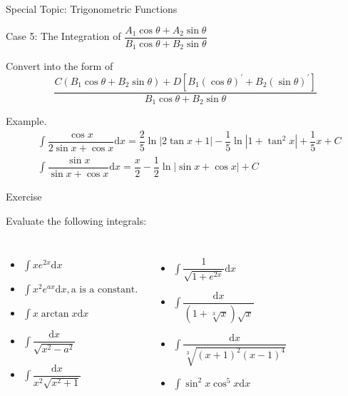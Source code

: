 \documentclass{beamer}
\begin{document}
    \begin{frame}[t]{Special Topic: Trigonometric Functions}
        \begin{block}{Case 5: The Integration of $\dfrac{A_{1} \cos \theta+A_{2} \sin \theta}{B_{1} \cos \theta+B_{2} \sin \theta}$}
        \par Convert into the form of $$\dfrac{C\left(B_{1} \cos \theta+B_{2} \sin \theta\right)+D\left[B_{1}(\cos \theta)^{\prime}+B_{2}(\sin \theta)^{\prime}\right]}{B_{1} \cos \theta+B_{2} \sin \theta}$$
        \end{block}
        \par \textcolor{yy}{Example.}
        \begin{equation*}\begin{aligned}
            & \int \dfrac{\cos x}{2 \sin x+\cos x} \mathrm{d} x = \dfrac{2}{5} \ln |2 \tan x+1|-\dfrac{1}{5} \ln \left|1+\tan ^{2} x\right|+\dfrac{1}{5} x+C\\
            & \int \dfrac{\sin x}{\sin x+\cos x} \mathrm{d} x = \dfrac{x}{2}-\dfrac{1}{2} \ln |\sin x+\cos x|+C
        \end{aligned}\end{equation*}
    \end{frame}

    \begin{frame}[t]{Exercise}
        \par Evaluate the following integrals:
        \begin{columns}[c]
            \begin{itemize}
                \item $\int x e^{2 x} \mathrm{d}x$
                \item $\int x^{2} e^{a x} \mathrm{d}x, \text {a is a constant. } $
                \item $\int x\arctan x \mathrm{d}x$   
                \item $\int \dfrac{\mathrm{d} x}{\sqrt{x^{2}-a^{2}}}$
                \item $\int \dfrac{\mathrm{d} x}{x^{2} \sqrt{x^{2}+1}}$
            \end{itemize}
        
            \begin{itemize}
                \item $\int \dfrac{1}{\sqrt{1+e^{2 x}}} \mathrm{d} x$
                \item $\int \dfrac{\mathrm{d} x}{(1+\sqrt[3]{x}) \sqrt{x}}$
                \item $\int \dfrac{\mathrm{d} x}{\sqrt[3]{(x+1)^{2}(x-1)^{4}}}$
                \item $\int \sin ^{2} x \cos ^{5} x \mathrm{d}x$
            \end{itemize}
        \end{columns}
    \end{frame}  
\end{document}
